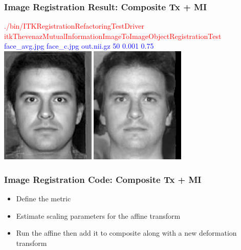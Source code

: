 \begin{frame}
\frametitle{Image Registration Result: Composite Tx + MI}
\textcolor{red}{./bin/ITKRegistrationRefactoringTestDriver itkThevenazMutualInformationImageToImageObjectRegistrationTest }\\
\textcolor{blue}{face\_avg.jpg face\_c.jpg out.nii.gz  50 0.001 0.75 }\\
\includegraphics[height=2.2in]{../Art/face_avg.jpg}
\includegraphics[height=2.2in]{../Art/face_c_to_face_avg.jpg}
\end{frame}

\begin{frame}
\frametitle{Image Registration Code: Composite Tx + MI}
\begin{itemize}
\item Define the metric
\item Estimate scaling parameters for the affine transform
\item Run the affine then add it to composite along with a new
  deformation transform
\end{itemize}
\end{frame}


